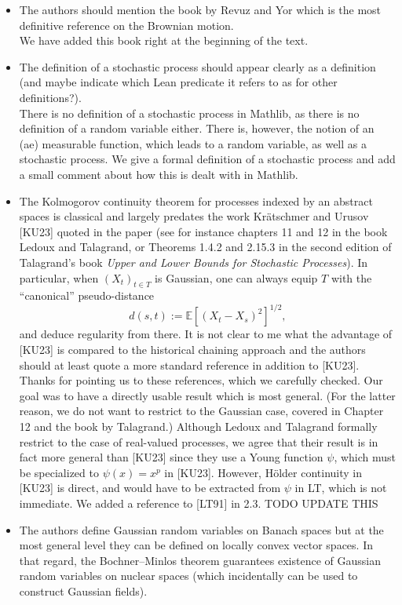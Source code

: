 \documentclass[11pt]{article}
\begin{document}
\begin{itemize}
  \item The authors should mention the book by Revuz and Yor which is the most definitive reference on the Brownian motion.
  \\{\color{blue} We have added this book right at the beginning of the text.}
  \item The definition of a stochastic process should appear clearly as a definition (and maybe indicate which Lean predicate it refers to as for other definitions?).
  \\{\color{blue} There is no definition of a stochastic process in Mathlib, as there is no definition of a random variable either. There is, however, the notion of an (ae) measurable function, which leads to a random variable, as well as a stochastic process. We give a formal definition of a stochastic process and add a small comment about how this is dealt with in Mathlib.}
  \item The Kolmogorov continuity theorem for processes indexed by an abstract spaces is classical and largely predates the work Kr\"atschmer and Urusov [KU23] quoted in the paper (see for instance chapters 11 and 12 in the book Ledoux and Talagrand, or Theorems 1.4.2 and 2.15.3 in the second edition of Talagrand's book \emph{Upper and Lower Bounds for Stochastic Processes}). In particular, when $(X_t)_{t \in T}$ is Gaussian, one can always equip $T$ with the
  ``canonical'' pseudo-distance
  \[
    d(s,t) := \mathbb{E}[(X_t - X_s)^2]^{1/2},
  \]
  and deduce regularity from there. It is not clear to me what the advantage
  of [KU23] is compared to the historical chaining approach and the authors
  should at least quote a more standard reference in addition to [KU23].
  \\{\color{blue} Thanks for pointing us to these references, which we carefully checked. Our goal was to have a directly usable result which is most general. (For the latter reason, we do not want to restrict to the Gaussian case, covered in Chapter 12 and the book by Talagrand.) Although Ledoux and Talagrand formally restrict to the case of real-valued processes, we agree that their result is in fact more general than [KU23] since they use a Young function $\psi$, which must be specialized to $\psi(x) = x^p$ in [KU23]. However, H\"older continuity in [KU23] is direct, and would have to be extracted from $\psi$ in LT, which is not immediate. We added a reference to [LT91] in 2.3. TODO UPDATE THIS}
  \item The authors define Gaussian random variables on Banach spaces but at the most general level they can be defined on locally convex vector spaces. In that regard, the Bochner--Minlos theorem guarantees existence of Gaussian random variables on nuclear spaces (which incidentally can be used to construct Gaussian fields).

\end{itemize}
\end{document}
